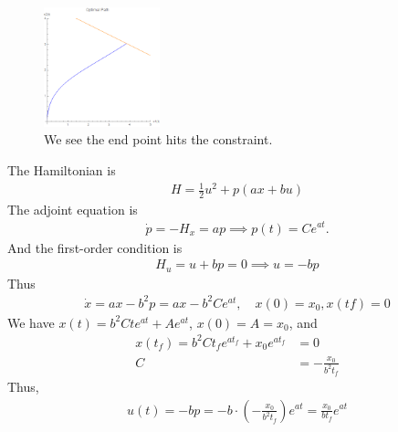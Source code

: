 \documentclass[12pt]{article}
\begin{document}
\begin{problem}[1]
\begin{enumerate}[label=(\alph*)]
\begin{figure}[H]
	\includegraphics[width=0.3\textwidth]{./figures/4.17.png}
	\caption{We see the end point hits the constraint.}
\end{figure}
\end{enumerate}
\end{problem}
\begin{problem}[2]
The Hamiltonian is
\begin{align*}
	H = \frac{1}{2} u^2 + p(ax+bu)
\end{align*}
The adjoint equation is
\begin{align*}
	\dot{p} = -H_x = ap \implies p(t) = C e^{at}.
\end{align*}
And the first-order condition is
\begin{align*}
	H_u = u+bp = 0 \implies u=-bp
\end{align*}
Thus
\begin{align*}
	\dot{x} = ax-b^2p = ax - b^2 C e^{at}, \quad x(0)=x_0,x(tf) = 0
\end{align*}
We have $ x(t) = b^2 C t e^{at} + A e^{at}$, $ x(0) = A = x_0$, and
\begin{align*}
	x(t_f) = b^2 C t_f e^{at_f} + x_0 e^{at_f} &= 0 \\
	C &= - \frac{x_0}{ b^2 t_f}
\end{align*}
Thus,
\begin{align*}
	u(t) = -bp = -b \cdot \left( - \frac{x_0}{b^2 t_f} \right) e^{at}  = \frac{x_0}{ b t_f} e^{at}
\end{align*}
\end{problem}
\end{document}
